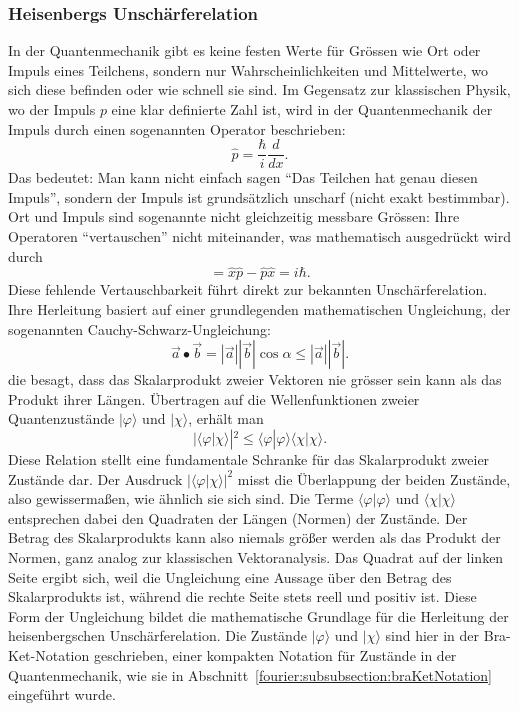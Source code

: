 \subsubsection{Heisenbergs Unschärferelation%
\label{fourier:subsubsection:unschaerferelation}}
In der Quantenmechanik gibt es keine festen Werte für Grössen wie Ort oder Impuls eines Teilchens, sondern nur Wahrscheinlichkeiten und Mittelwerte, wo sich diese befinden oder wie schnell sie sind.
Im Gegensatz zur klassischen Physik, wo der Impuls $p$ eine klar definierte Zahl ist, wird in der Quantenmechanik der Impuls durch einen sogenannten Operator beschrieben:
\begin{equation}
	\hat{p} = \frac{\hbar}{i} \frac{d}{dx}.
\end{equation}
Das bedeutet:
Man kann nicht einfach sagen ``Das Teilchen hat genau diesen Impuls'', sondern der Impuls ist grundsätzlich unscharf (nicht exakt bestimmbar).
Ort und Impuls sind sogenannte nicht gleichzeitig messbare Grössen:
Ihre Operatoren ``vertauschen'' nicht miteinander, was mathematisch ausgedrückt wird durch
\begin{equation}
	[\hat{x},\hat{p}] = \hat{x} \hat{p} - \hat{p} \hat{x} = i \hbar.
\end{equation}
Diese fehlende Vertauschbarkeit führt direkt zur bekannten Unschärferelation.
Ihre Herleitung basiert auf einer grundlegenden mathematischen Ungleichung, der sogenannten Cauchy-Schwarz-Ungleichung:
\begin{equation}
	\vec{a} \bullet \vec{b} = |\vec{a}| |\vec{b}|\cos\alpha \le |\vec{a}| |\vec{b}|.
\end{equation}
die besagt, dass das Skalarprodukt zweier Vektoren nie grösser sein kann als das Produkt ihrer Längen.
Übertragen auf die Wellenfunktionen zweier Quantenzustände $|\varphi\rangle$ und $|\chi\rangle$, erhält man
\begin{equation}
	|\langle\varphi | \chi\rangle|^2 \le \langle\varphi | \varphi\rangle \langle\chi | \chi\rangle.
\end{equation}
Diese Relation stellt eine fundamentale Schranke für das Skalarprodukt zweier Zustände dar.
Der Ausdruck $|\langle\varphi|\chi\rangle|^2$ misst die Überlappung der beiden Zustände, also gewissermaßen, wie ähnlich sie sich sind.
Die Terme $\langle\varphi|\varphi\rangle$ und $\langle\chi|\chi\rangle$ entsprechen dabei den Quadraten der Längen (Normen) der Zustände.
Der Betrag des Skalarprodukts kann also niemals größer werden als das Produkt der Normen, ganz analog zur klassischen Vektoranalysis.
Das Quadrat auf der linken Seite ergibt sich, weil die Ungleichung eine Aussage über den Betrag des Skalarprodukts ist, während die rechte Seite stets reell und positiv ist.
Diese Form der Ungleichung bildet die mathematische Grundlage für die Herleitung der heisenbergschen Unschärferelation.
Die Zustände $|\varphi\rangle$ und $|\chi\rangle$ sind hier in der Bra-Ket-Notation geschrieben, einer kompakten Notation für Zustände in der Quantenmechanik, wie sie in Abschnitt~\ref{fourier:subsubsection:braKetNotation} eingeführt wurde.

